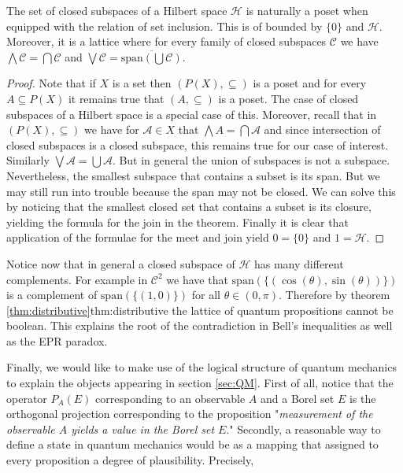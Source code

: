 \begin{theorem}
The set of closed subspaces of a Hilbert space $\mathcal{H}$ is naturally a poset when equipped with the relation of set inclusion. This is of bounded by $\{0\}$ and $\mathcal{H}$. Moreover, it is a lattice where for every family of closed subspaces $\mathcal{C}$ we have $\bigwedge \mathcal{C} = \bigcap \mathcal{C}$ and $\bigvee \mathcal{C} = \overline{\text{span}\left(\bigcup\mathcal{C}\right)}$.
\end{theorem}

\begin{proof}
Note that if $X$ is a set then $(P(X),\subseteq)$ is a poset and for every $A\subseteq P(X)$ it remains true that $(A,\subseteq)$ is a poset. The case of closed subspaces of a Hilbert space is a special case of this. Moreover, recall that in $(P(X),\subseteq)$ we have for $\mathcal{A}\in X$ that $\bigwedge A = \bigcap \mathcal{A}$ and since intersection of closed subspaces is a closed subspace, this remains true for our case of interest. Similarly $\bigvee\mathcal{A}=\bigcup\mathcal{A}$. But in general the union of subspaces is not a subspace. Nevertheless, the smallest subspace that contains a subset is its span. But we may still run into trouble because the span may not be closed. We can solve this by noticing that the smallest closed set that contains a subset is its closure, yielding the formula for the join in the theorem. Finally it is clear that application of the formulae for the meet and join yield $0=\{0\}$ and $1=\mathcal{H}$. 
\end{proof}

Notice now that in general a closed subspace of $\mathcal{H}$ has many different complements. For example in $\mathcal{C}^2$ we have that $\text{span}(\{(\cos(\theta),\sin(\theta))\})$ is a complement of $\text{span}(\{(1,0)\})$ for all $\theta\in (0,\pi)$. Therefore by theorem \ref{thm:distributive}{thm:distributive} the lattice of quantum propositions cannot be boolean. This explains the root of the contradiction in Bell's inequalities as well as the EPR paradox.

Finally, we would like to make use of the logical structure of quantum mechanics to explain the objects appearing in section \ref{sec:QM}. First of all, notice that the operator $P_A(E)$ corresponding to an observable $A$ and a Borel set $E$ is the orthogonal projection corresponding to the proposition "\textit{measurement of the observable $A$ yields a value in the Borel set $E$}." Secondly, a reasonable way to define a state in quantum mechanics would be as a mapping that assigned to every proposition a degree of plausibility. Precisely,

